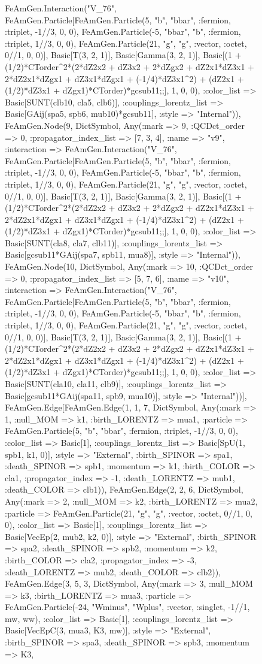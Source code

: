\documentclass{revtex4}
\begin{document}
\begin{figure}[!htb]
\begin{center}
{FeAmGen.Interaction("V_76", FeAmGen.Particle[FeAmGen.Particle(5, "b", "bbar", :fermion, :triplet, -1//3, 0, 0), FeAmGen.Particle(-5, "bbar", "b", :fermion, :triplet, 1//3, 0, 0), FeAmGen.Particle(21, "g", "g", :vector, :octet, 0//1, 0, 0)], Basic[T(3, 2, 1)], Basic[Gamma(3, 2, 1)], Basic[(1 + (1/2)*CTorder^2*(2*dZ2x2 + dZ3x2 + 2*dZgx2 + dZ2x1*dZ3x1 + 2*dZ2x1*dZgx1 + dZ3x1*dZgx1 + (-1/4)*dZ3x1^2) + (dZ2x1 + (1/2)*dZ3x1 + dZgx1)*CTorder)*gcsub11;;], 1, 0, 0), :color_list => Basic[SUNT(clb10, cla5, clb6)], :couplings_lorentz_list => Basic[GAij(spa5, spb6, mub10)*gcsub11], :style => "Internal")), FeAmGen.Node(9, Dict{Symbol, Any}(:mark => 9, :QCDct_order => 0, :propagator_index_list => [7, 3, 4], :name => "v9", :interaction => FeAmGen.Interaction("V_76", FeAmGen.Particle[FeAmGen.Particle(5, "b", "bbar", :fermion, :triplet, -1//3, 0, 0), FeAmGen.Particle(-5, "bbar", "b", :fermion, :triplet, 1//3, 0, 0), FeAmGen.Particle(21, "g", "g", :vector, :octet, 0//1, 0, 0)], Basic[T(3, 2, 1)], Basic[Gamma(3, 2, 1)], Basic[(1 + (1/2)*CTorder^2*(2*dZ2x2 + dZ3x2 + 2*dZgx2 + dZ2x1*dZ3x1 + 2*dZ2x1*dZgx1 + dZ3x1*dZgx1 + (-1/4)*dZ3x1^2) + (dZ2x1 + (1/2)*dZ3x1 + dZgx1)*CTorder)*gcsub11;;], 1, 0, 0), :color_list => Basic[SUNT(cla8, cla7, clb11)], :couplings_lorentz_list => Basic[gcsub11*GAij(spa7, spb11, mua8)], :style => "Internal")), FeAmGen.Node(10, Dict{Symbol, Any}(:mark => 10, :QCDct_order => 0, :propagator_index_list => [5, 7, 6], :name => "v10", :interaction => FeAmGen.Interaction("V_76", FeAmGen.Particle[FeAmGen.Particle(5, "b", "bbar", :fermion, :triplet, -1//3, 0, 0), FeAmGen.Particle(-5, "bbar", "b", :fermion, :triplet, 1//3, 0, 0), FeAmGen.Particle(21, "g", "g", :vector, :octet, 0//1, 0, 0)], Basic[T(3, 2, 1)], Basic[Gamma(3, 2, 1)], Basic[(1 + (1/2)*CTorder^2*(2*dZ2x2 + dZ3x2 + 2*dZgx2 + dZ2x1*dZ3x1 + 2*dZ2x1*dZgx1 + dZ3x1*dZgx1 + (-1/4)*dZ3x1^2) + (dZ2x1 + (1/2)*dZ3x1 + dZgx1)*CTorder)*gcsub11;;], 1, 0, 0), :color_list => Basic[SUNT(cla10, cla11, clb9)], :couplings_lorentz_list => Basic[gcsub11*GAij(spa11, spb9, mua10)], :style => "Internal"))], FeAmGen.Edge[FeAmGen.Edge(1, 1, 7, Dict{Symbol, Any}(:mark => 1, :null_MOM => k1, :birth_LORENTZ => mua1, :particle => FeAmGen.Particle(5, "b", "bbar", :fermion, :triplet, -1//3, 0, 0), :color_list => Basic[1], :couplings_lorentz_list => Basic[SpU(1, spb1, k1, 0)], :style => "External", :birth_SPINOR => spa1, :death_SPINOR => spb1, :momentum => k1, :birth_COLOR => cla1, :propagator_index => -1, :death_LORENTZ => mub1, :death_COLOR => clb1)), FeAmGen.Edge(2, 2, 6, Dict{Symbol, Any}(:mark => 2, :null_MOM => k2, :birth_LORENTZ => mua2, :particle => FeAmGen.Particle(21, "g", "g", :vector, :octet, 0//1, 0, 0), :color_list => Basic[1], :couplings_lorentz_list => Basic[VecEp(2, mub2, k2, 0)], :style => "External", :birth_SPINOR => spa2, :death_SPINOR => spb2, :momentum => k2, :birth_COLOR => cla2, :propagator_index => -3, :death_LORENTZ => mub2, :death_COLOR => clb2)), FeAmGen.Edge(3, 5, 3, Dict{Symbol, Any}(:mark => 3, :null_MOM => k3, :birth_LORENTZ => mua3, :particle => FeAmGen.Particle(-24, "Wminus", "Wplus", :vector, :singlet, -1//1, mw, ww), :color_list => Basic[1], :couplings_lorentz_list => Basic[VecEpC(3, mua3, K3, mw)], :style => "External", :birth_SPINOR => spa3, :death_SPINOR => spb3, :momentum => K3, }
\end{center}
\end{figure}
\end{document}
